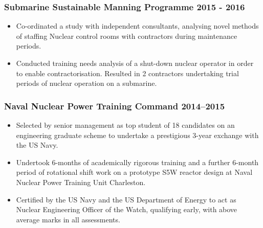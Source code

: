 \documentclass[a4paper, oneside, final, 11pt]{scrartcl} %
\begin{document}
\smallskip 

\subsubsection*{Submarine Sustainable Manning Programme \hfill 2015 - 2016}  
\normalfont
\begin{itemize}
	\item Co-ordinated a study with independent consultants, analysing novel methods of staffing Nuclear control rooms with contractors during maintenance periods. 
	
	\item Conducted training needs analysis of a shut-down nuclear operator in order to enable contractorisation. Resulted in 2 contractors undertaking trial periods of nuclear operation on a submarine.\end{itemize}

\smallskip 
				
\subsubsection*{Naval Nuclear Power Training Command \hfill 2014--2015}  
\normalfont
\begin{itemize}
	\item Selected by senior management as top student of 18 candidates on an engineering graduate scheme to undertake a prestigious 3-year exchange with the US Navy. 
	
	\item Undertook 6-months of academically rigorous training and a further 6-month period of rotational shift work on a prototype S5W reactor design at Naval Nuclear Power Training Unit Charleston. 
	\item Certified by the US Navy and the US Department of Energy to act as Nuclear Engineering Officer of the Watch, qualifying early, with above average marks in all assessments.
\end{itemize}

\smallskip  
				
\end{document}
